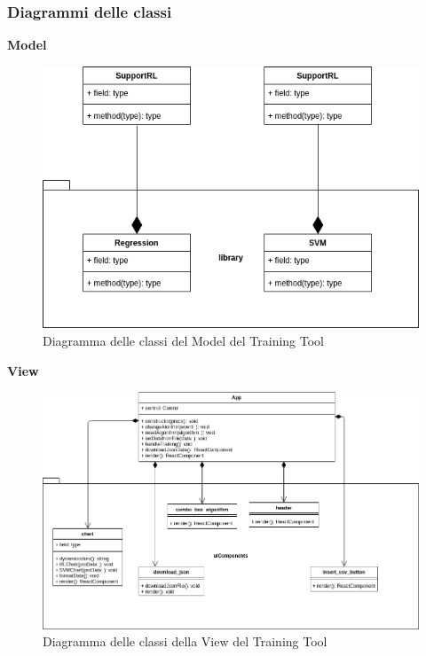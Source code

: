 \subsubsection{Diagrammi delle classi}
\textbf{Model}
\begin{figure}[H]
\centering
\includegraphics[scale=0.5]{../../Diagrams/Classes_diagrams/tool_model.png}
\caption{Diagramma delle classi del Model del Training Tool}
\end{figure}

\textbf{View}
\begin{figure}[H]
\centering
\includegraphics[scale=0.5]{../../Diagrams/Classes_diagrams/tool_view.png}
\caption{Diagramma delle classi della View del Training Tool}
\end{figure}

